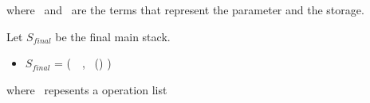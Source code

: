 \documentclass[runningheads]{llncs}
\begin{document}
where \VPAR\ and \VSTORAGE\ are the terms that represent the parameter and the storage. 



\noindent Let $S_{final}$  be the final main stack. 

\begin{itemize}
\item[]  $S_{final}$ = (\PAIR\ \VOPERATIONLIST\ \VSTORAGE, \TPAIR\ (\TOPERATIONLIST) \TYS) \STACKCONCAT\ \EMPTYSTACK
\end{itemize}

where \VOPERATIONLIST\ repesents a operation list



\end{document}
